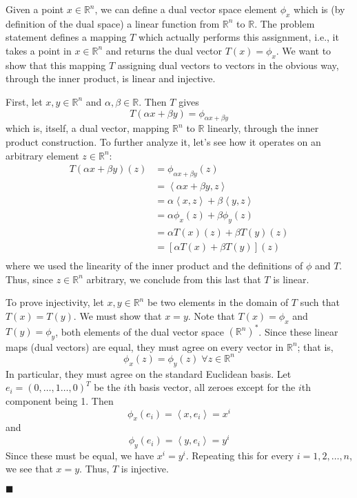 \documentclass[12pt]{article}
\renewcommand{\qed}{\hfill$\blacksquare$}
\renewenvironment{proof}{\begin{addmargin}[1em]{0em}\begin{newproof}}{\end{newproof}\end{addmargin}\qed}
\begin{document}
 \begin{proof}
 Given a point $x\in \mathbb{R}^n$, we can define a dual vector space element $\phi_x$ which is (by definition of the dual space) a linear function from $\mathbb{R}^n$ to $\mathbb{R}$. The problem statement defines a mapping $T$ which actually performs this assignment, i.e., it takes a point in $x \in \mathbb{R}^n$ and returns the dual vector $T\left(x\right) = \phi_x$. We want to show that this mapping $T$ assigning dual vectors to vectors in the obvious way, through the inner product, is linear and injective.
 
 First, let $x,y \in \mathbb{R}^n$ and $\alpha, \beta \in \mathbb{R}$. Then $T$ gives
$$ T\left(\alpha x + \beta y \right) = \phi_{\alpha x + \beta y} $$
which is, itself, a dual vector, mapping $\mathbb{R}^n$ to $\mathbb{R}$ linearly, through the inner product construction. To further analyze it, let's see how it operates on an arbitrary element $z \in \mathbb{R}^n$: 
\begin{equation*}
\begin{split}
T\left(\alpha x + \beta y\right)\left(z\right) & = \phi_{\alpha x + \beta y} \left(z\right) \\
& = \left\langle \alpha x + \beta y, z \right\rangle \\
& = \alpha \left\langle x,z\right\rangle + \beta \left\langle y,z\right\rangle \\
& = \alpha \phi_x \left(z\right) + \beta \phi_y \left(z\right) \\
& = \alpha T\left(x\right) \left(z\right) + \beta T\left(y\right)\left(z\right) \\
& = \left[ \alpha T\left(x\right) + \beta T\left(y\right) \right] \left(z\right) \\
\end{split}
\end{equation*}
where we used the linearity of the inner product and the definitions of $\phi$ and $T$. Thus, since $z\in \mathbb{R}^n$ arbitrary, we conclude from this last that $T$ is linear. 

To prove injectivity, let $x,y\in \mathbb{R}^n$ be two elements in the domain of $T$ such that $T\left(x\right) = T\left(y\right)$. We must show that $x=y$. Note that $T\left(x\right) = \phi_x $ and $T\left(y\right) = \phi_y $, both elements of the dual vector space $\left(\mathbb{R}^n\right)^*$. Since these linear maps (dual vectors) are equal, they must agree on every vector in $\mathbb{R}^n$; that is,
$$ \phi_x \left(z\right) = \phi_y\left(z\right) \; \forall z\in \mathbb{R}^n $$
In particular, they must agree on the standard Euclidean basis. Let $e_i = \left(0,\ldots,1\ldots,0\right)^T$ be the $i$th basis vector, all zeroes except for the $i$th component being 1. Then
$$ \phi_x \left(e_i\right) = \left\langle x, e_i \right\rangle = x^i $$
and 
$$ \phi_y \left(e_i\right) = \left\langle y, e_i \right\rangle = y^i $$
Since these must be equal, we have $x^i = y^i$. Repeating this for every $i = 1,2,\ldots,n$, we see that $x=y$. Thus, $T$ is injective.


\end{proof}
\end{document}
